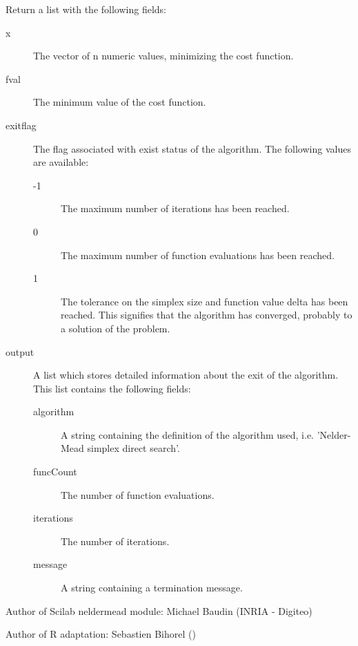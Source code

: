 \begin{Value}
Return a list with the following fields:\begin{description}

\item[x] The vector of n numeric values, minimizing the cost function.
\item[fval] The minimum value of the cost function.
\item[exitflag] The flag associated with exist status of the algorithm.
The following values are available:\begin{description}

\item[-1] The maximum number of iterations has been reached.
\item[0] The maximum number of function evaluations has been reached.
\item[1] The tolerance on the simplex size and function value delta has
been reached. This signifies that the algorithm has converged,
probably to a solution of the problem.

\end{description}


\item[output] A list which stores detailed information about the exit of the
algorithm. This list contains the following fields:\begin{description}

\item[algorithm] A string containing the definition of the algorithm
used, i.e. 'Nelder-Mead simplex direct search'.
\item[funcCount] The number of function evaluations.
\item[iterations] The number of iterations.
\item[message] A string containing a termination message.

\end{description}



\end{description}

\end{Value}
%
\begin{Author}\relax
Author of Scilab neldermead module: Michael Baudin (INRIA - Digiteo)

Author of R adaptation: Sebastien Bihorel ()
\end{Author}
%
